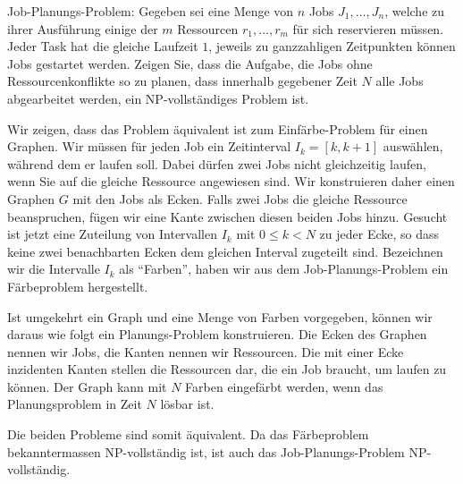 Job-Planungs-Problem:
Gegeben sei eine Menge von $n$ Jobs $J_1,\dots,J_n$, welche zu ihrer
Ausführung einige der $m$ Ressourcen $r_1,\dots,r_m$ für sich reservieren
müssen. Jeder Task hat die gleiche Laufzeit $1$, jeweils zu ganzzahligen
Zeitpunkten können Jobs gestartet werden. Zeigen Sie, dass die
Aufgabe, die Jobs ohne Ressourcenkonflikte so zu planen, dass innerhalb
gegebener Zeit $N$ alle Jobs abgearbeitet werden, ein NP-vollständiges Problem
ist.


\begin{loesung}
Wir zeigen, dass das Problem äquivalent ist zum Einfärbe-Problem für
einen Graphen. Wir müssen für jeden Job ein Zeitinterval $I_k=[k,k+1]$
auswählen, während dem er laufen soll. Dabei dürfen zwei Jobs nicht
gleichzeitig laufen, wenn Sie auf die gleiche Ressource angewiesen sind.
Wir konstruieren daher einen Graphen $G$ mit den Jobs als Ecken. Falls
zwei Jobs die gleiche Ressource beanspruchen, fügen wir eine Kante
zwischen diesen beiden Jobs hinzu. Gesucht ist jetzt eine Zuteilung
von Intervallen $I_k$ mit $0\le k< N$ zu jeder Ecke, so dass keine
zwei benachbarten Ecken dem gleichen Interval zugeteilt sind. Bezeichnen
wir die Intervalle $I_k$ als ``Farben'', haben wir aus dem Job-Planungs-Problem
ein Färbeproblem hergestellt.

Ist umgekehrt ein Graph und eine Menge von Farben vorgegeben, können
wir daraus wie folgt ein Planungs-Problem konstruieren. Die Ecken
des Graphen nennen wir Jobs, die Kanten nennen wir Ressourcen. Die
mit einer Ecke inzidenten Kanten stellen die Ressourcen dar, die ein
Job braucht, um laufen zu können. Der Graph kann mit $N$ Farben
eingefärbt werden, wenn das Planungsproblem in Zeit $N$ lösbar ist.

Die beiden Probleme sind somit äquivalent. Da das Färbeproblem
bekanntermassen NP-vollständig ist, ist auch das Job-Planungs-Problem
NP-vollständig.
\end{loesung}
